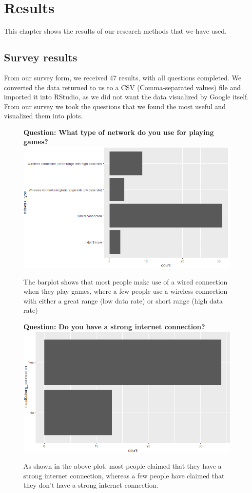 \section{Results}
This chapter shows the results of our research methods that we have used.

\subsection{Survey results}
From our survey form, we received 47 results, with all questions completed. We converted the data returned to us to a CSV (Comma-separated values) file and imported it into RStudio, as we did not want the data visualized by Google itself. From our survey we took the questions that we found the most useful and visualized them into plots. 
\begin{figure}[ht]
	\centering
	\textbf{Question: What type of network do you use for playing games?}
	\includegraphics[width=12cm]{../img/network.png}
	\caption{The barplot shows that most people make use of a wired connection when they play games, where a few people use a wireless connection with either a great range (low data rate) or short range (high data rate)}
\end{figure}
\begin{figure}[ht]
	\centering
	\textbf{Question: Do you have a strong internet connection?}
	\includegraphics[width=12cm]{../img/connection.png}
	\caption{As shown in the above plot, most people claimed that they have a strong internet connection, whereas a few people have claimed that they don't have a strong internet connection.}
\end{figure}
